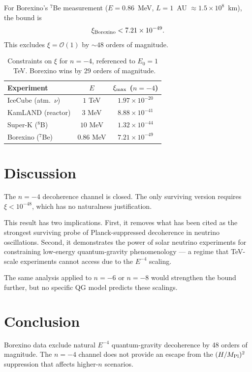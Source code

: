 \documentclass[twocolumn,prd,superscriptaddress,nofootinbib]{revtex4-2}
\begin{document}
For Borexino's $^7$Be measurement ($E = 0.86$~MeV,
$L = 1$~AU $\approx 1.5 \times 10^8$~km), the bound is
\begin{equation}
\xi_{\rm Borexino} < 7.21 \times 10^{-49}.
\end{equation}
This excludes $\xi = \mathcal{O}(1)$ by $\sim 48$ orders of
magnitude.

\begin{table}[h]
\centering
\begin{tabular}{lcc}
\hline
Experiment & $E$ & $\xi_{\rm max}$ ($n=-4$) \\
\hline
IceCube (atm.\ $\nu$) & $1$ TeV & $1.97 \times 10^{-20}$ \\
KamLAND (reactor)     & $3$ MeV & $8.88 \times 10^{-41}$ \\
Super-K ($^8$B)       & $10$ MeV & $1.32 \times 10^{-44}$ \\
Borexino ($^7$Be)     & $0.86$ MeV & $7.21 \times 10^{-49}$ \\
\hline
\end{tabular}
\caption{Constraints on $\xi$ for $n = -4$, referenced to
$E_0 = 1$~TeV. Borexino wins by 29 orders of magnitude.}
\end{table}

\section{Discussion}

The $n = -4$ decoherence channel is closed. The only surviving
version requires $\xi < 10^{-48}$, which has no naturalness
justification.

This result has two implications. First, it removes what has been
cited as the strongest surviving probe of Planck-suppressed
decoherence in neutrino oscillations. Second, it demonstrates the
power of solar neutrino experiments for constraining low-energy
quantum-gravity phenomenology --- a regime that TeV-scale
experiments cannot access due to the $E^{-4}$ scaling.

The same analysis applied to $n = -6$ or $n = -8$ would strengthen
the bound further, but no specific QG model predicts these scalings.

\section{Conclusion}

Borexino data exclude natural $E^{-4}$ quantum-gravity
decoherence by 48 orders of magnitude. The $n = -4$ channel does
not provide an escape from the $(H/M_{\rm Pl})^2$ suppression that
affects higher-$n$ scenarios.
\end{document}
